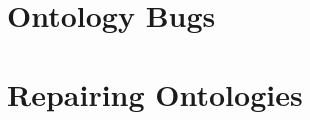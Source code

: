 \section{Ontology Bugs} \label{ontology-bugs}





\section{Repairing Ontologies} \label{ontology-repair}


